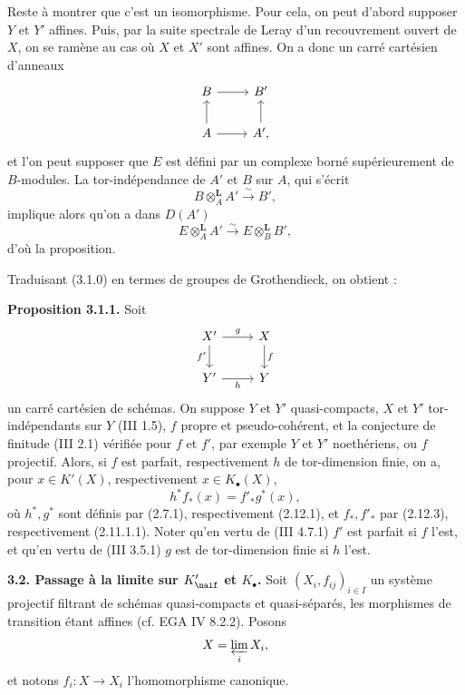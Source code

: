 \documentclass[11pt]{article}
\begin{document}
Reste à montrer que c'est un isomorphisme. Pour cela, on peut d'abord supposer \(Y\) et \(Y'\) affines. Puis, par la suite spectrale de Leray d'un recouvrement ouvert de \(X\), on se ramène au cas où \(X\) et \(X'\) sont affines. On a donc un carré cartésien d'anneaux
\[
\begin{tikzcd}
B\arrow[r] & B'\\
A\arrow[u]\arrow[r] & A'\arrow[u],
\end{tikzcd}
\]
et l'on peut supposer que \(E\) est défini par un complexe borné supérieurement de \(B\)-modules. La tor-indépendance de \(A'\) et \(B\) sur \(A\), qui s'écrit
\[
 B\otimes_A^{\mathbf L}A'\xrightarrow{\sim}B',
\]
implique alors qu'on a dans \(D(A')\)
\[
 E\otimes_A^{\mathbf L}A'\xrightarrow{\sim}E\otimes_B^{\mathbf L}B',
\]
d'où la proposition.

Traduisant (3.1.0) en termes de groupes de Grothendieck, on obtient :

\textbf{Proposition 3.1.1.} Soit
\[
\begin{tikzcd}
X' \arrow[r,"g"]\arrow[d,"f'"'] & X\arrow[d,"f"]\\
Y' \arrow[r,"h"'] & Y
\end{tikzcd}
\]
un carré cartésien de schémas. On suppose \(Y\) et \(Y'\) quasi-compacts, \(X\) et \(Y'\) tor-indépendants sur \(Y\) (III 1.5), \(f\) propre et pseudo-cohérent, et la conjecture de finitude (III 2.1) vérifiée pour \(f\) et \(f'\), par exemple \(Y\) et \(Y'\) noethériens, ou \(f\) projectif. Alors, si \(f\) est parfait, respectivement \(h\) de tor-dimension finie, on a, pour \(x\in K'(X)\), respectivement \(x\in K_{\bullet}(X)\),
\[
 h^* f_*(x)=f'_* g^*(x),
\]
où \(h^*,g^*\) sont définis par (2.7.1), respectivement (2.12.1), et \(f_*,f'_*\) par (2.12.3), respectivement (2.11.1.1). Noter qu'en vertu de (III 4.7.1) \(f'\) est parfait si \(f\) l'est, et qu'en vertu de (III 3.5.1) \(g\) est de tor-dimension finie si \(h\) l'est.

\textbf{3.2. Passage à la limite sur \(K'_{\naif}\) et \(K_{\bullet}\).} Soit \((X_i,f_{ij})_{i\in I}\) un système projectif filtrant de schémas quasi-compacts et quasi-séparés, les morphismes de transition étant affines (cf. EGA IV 8.2.2). Posons
\[
 X=\varprojlim_i X_i,
\]
et notons \(f_i:X\to X_i\) l'homomorphisme canonique.
\end{document}
